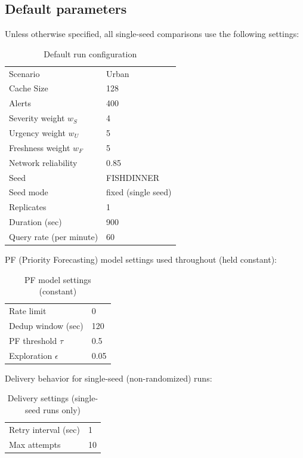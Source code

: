 \documentclass[11pt,twocolumn]{article}
\begin{document}
\subsection{Default parameters}
Unless otherwise specified, all single-seed comparisons use the following settings:

\begin{table}[h]
\centering
\caption{Default run configuration}
\label{tab:default-config}
\begin{tabular}{@{}ll@{}}
    \toprule
Scenario & Urban \\
Cache Size & 128 \\
Alerts & 400 \\
Severity weight $w_S$ & 4 \\
Urgency weight $w_U$ & 5 \\
Freshness weight $w_F$ & 5 \\
Network reliability & 0.85 \\
Seed & FISHDINNER \\
Seed mode & fixed (single seed) \\
Replicates & 1 \\
Duration (sec) & 900 \\
Query rate (per minute) & 60 \\
\bottomrule
\end{tabular}
\end{table}

\noindent PF (Priority Forecasting) model settings used throughout (held constant):

\begin{table}[h]
\centering
\caption{PF model settings (constant)}
\label{tab:pf-settings}
\begin{tabular}{@{}ll@{}}
    \toprule
Rate limit & 0 \\
Dedup window (sec) & 120 \\
PF threshold $\tau$ & 0.5 \\
Exploration $\epsilon$ & 0.05 \\
\bottomrule
\end{tabular}
\end{table}

\noindent Delivery behavior for single-seed (non-randomized) runs:

\begin{table}[h]
\centering
\caption{Delivery settings (single-seed runs only)}
\label{tab:delivery-settings}
\begin{tabular}{@{}ll@{}}
   \toprule
Retry interval (sec) & 1 \\
Max attempts & 10 \\
\bottomrule
\end{tabular}
\end{table}
\end{document}
